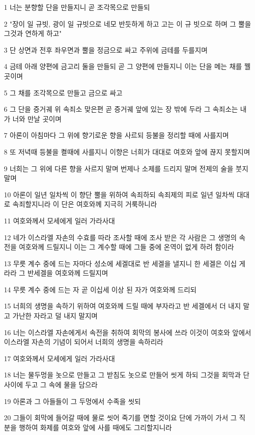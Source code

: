 \par 1 너는 분향할 단을 만들지니 곧 조각목으로 만들되
\par 2 "장이 일 규빗, 광이 일 규빗으로 네모 반듯하게 하고 고는 이 규 빗으로 하며 그 뿔을 그것과 연하게 하고"
\par 3 단 상면과 전후 좌우면과 뿔을 정금으로 싸고 주위에 금테를 두를지며
\par 4 금테 아래 양편에 금고리 둘을 만들되 곧 그 양편에 만들지니 이는 단을 메는 채를 꿸 곳이며
\par 5 그 채를 조각목으로 만들고 금으로 싸고
\par 6 그 단을 증거궤 위 속죄소 맞은편 곧 증거궤 앞에 있는 장 밖에 두라 그 속죄소는 내가 너와 만날 곳이며
\par 7 아론이 아침마다 그 위에 향기로운 향을 사르되 등불을 정리할 때에 사를지며
\par 8 또 저녁때 등불을 켤때에 사를지니 이향은 너희가 대대로 여호와 앞에 끊지 못할지며
\par 9 너희는 그 위에 다른 향을 사르지 말며 번제나 소제를 드리지 말며 전제의 술을 붓지 말며
\par 10 아론이 일년 일차씩 이 향단 뿔을 위하여 속죄하되 속죄제의 피로 일년 일차씩 대대로 속죄할지니라 이 단은 여호와께 지극히 거룩하니라
\par 11 여호와께서 모세에게 일러 가라사대
\par 12 네가 이스라엘 자손의 수효를 따라 조사할 때에 조사 받은 각 사람은 그 생명의 속전을 여호와께 드릴지니 이는 그 계수할 때에 그들 중에 온역이 없게 하려 함이라
\par 13 무릇 계수 중에 드는 자마다 성소에 세겔대로 반 세겔을 낼지니 한 세겔은 이십 게라라 그 반세겔을 여호와께 드릴지며
\par 14 무릇 계수 중에 드는 자 곧 이십세 이상 된 자가 여호와께 드리되
\par 15 너희의 생명을 속하기 위하여 여호와께 드릴 때에 부자라고 반 세겔에서 더 내지 말고 가난한 자라고 덜 내지 말지며
\par 16 너는 이스라엘 자손에게서 속전을 취하여 회막의 봉사에 쓰라 이것이 여호와 앞에서 이스라엘 자손의 기념이 되어서 너희의 생명을 속하리라
\par 17 여호와께서 모세에게 일러 가라사대
\par 18 너는 물두멍을 놋으로 만들고 그 받침도 놋으로 만들어 씻게 하되 그것을 회막과 단 사이에 두고 그 속에 물을 담으라
\par 19 아론과 그 아들들이 그 두멍에서 수족을 씻되
\par 20 그들이 회막에 들어갈 때에 물로 씻어 죽기를 면할 것이요 단에 가까이 가서 그 직분을 행하여 화제를 여호와 앞에 사를 때에도 그리할지니라
